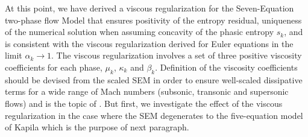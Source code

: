 \documentclass[preprint,10pt]{elsarticle}
\begin{document}
%
At this point, we have derived a viscous regularization for the Seven-Equation two-phase flow Model that ensures positivity of the entropy residual, uniqueness of the numerical solution when assuming concavity of the phasic entropy $s_k$, and is consistent with the viscous regularization derived for Euler equations \cite{jlg, Marco_paper_low_mach} in the limit $\alpha_k \to 1$. The viscous regularization involves a set of three positive viscosity coefficients for each phase, $\mu_k$, $\kappa_k$ and $\beta_k$. Definition of the viscosity coefficients should be devised from the scaled SEM in order to ensure well-scaled dissipative terms for a wide range of Mach numbers (subsonic, transonic and supersonic flows) and is the topic of . But first, we investigate the effect of the viscous regularization in the case where the SEM degenerates to the five-equation model of Kapila \cite{Kapila_2001} which is the purpose of next paragraph.
%
\end{document}

